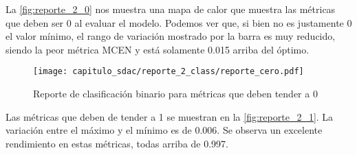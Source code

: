 \begin{table}[H]
    \centering
    \caption{Métricas de clasificación binaria}\label{tabla:reporte_completo_2}
    \end{table}

La \autoref{fig:reporte_2_0} nos muestra una mapa de calor que muestra las
métricas que deben ser 0 al evaluar el modelo. Podemos ver que, si bien no es
justamente 0 el valor mínimo, el rango de variación mostrado por la barra es muy
reducido, siendo la peor métrica MCEN y está solamente 0.015 arriba del óptimo.

\begin{figure}[H]
    \centering
    \texttt{[image: capitulo\_sdac/reporte\_2\_class/reporte\_cero.pdf]}
    \caption{Reporte de clasificación binario para métricas que deben tender a 0}\label{fig:reporte_2_0}
\end{figure}

Las métricas que deben de tender a 1 se muestran en la
\autoref{fig:reporte_2_1}. La variación entre el máximo y el mínimo es de 0.006. Se observa
un excelente rendimiento en estas métricas, todas arriba de 0.997.

